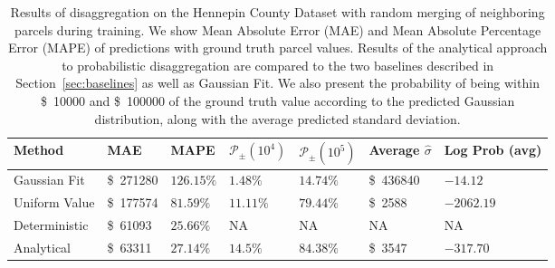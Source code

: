 \documentclass[10pt,twocolumn,a4paper]{article}
\newcommand{\cash}[1]{\SI{#1}[\$]{}}
\begin{document}
\begin{table*}
\centering
{
\setlength{\tabcolsep}{1em}
\renewcommand{\arraystretch}{1.2}
 \begin{tabular}{lllllll} 
 \toprule
 Method  & MAE & MAPE & $\mathcal{P}_\pm(10^4)$ & $\mathcal{P}_\pm(10^5)$ & Average $\hat{\sigma}$ & Log Prob (avg) \\ [0.5ex]
 \midrule
 Gaussian Fit & \cash{271280} & $126.15\% $  & $1.48\%$ & $14.74\%$ & \cash{436840} & $-14.12$ \\ 
 
 Uniform Value & \cash{177574}  & $81.59\%$ & $11.11\%$  & $79.44\%$  & \cash{2588} & $-2062.19$ \\
  
 Deterministic & \cash{61093}  & $25.66\%$ & NA & NA & NA & NA\\ 
 
 \midrule
 
 
 
 
 Analytical & \cash{63311} & $27.14\%$ & $14.5\%$ & $84.38\%$ & \cash{3547} & $-317.70$ \\
 
 \bottomrule
\end{tabular}
}
\caption{Results of disaggregation on the Hennepin County Dataset with random merging of neighboring parcels during training. We show Mean Absolute Error (MAE) and Mean Absolute Percentage Error (MAPE) of predictions with ground truth parcel values. Results of the analytical approach to probabilistic disaggregation are compared to the two baselines described in Section~\ref{sec:baselines} as well as Gaussian Fit. We also present the probability of being within \cash{10000} and \cash{100000} of the ground truth value according to the predicted Gaussian distribution, along with the average predicted standard deviation.}
\label{tab:merged_results}
\end{table*}
 
\end{document}
